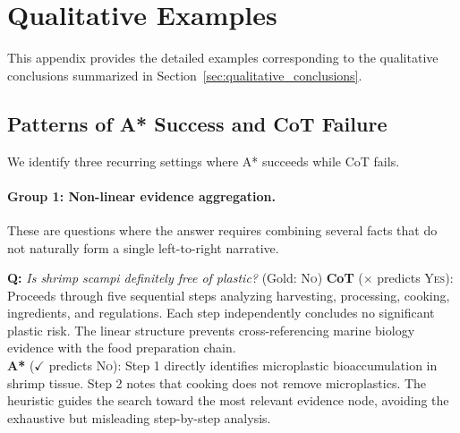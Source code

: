 \documentclass[11pt]{article}
\begin{document}



\section{Qualitative Examples}
\label{app:qualitative_examples}

This appendix provides the detailed examples corresponding to the qualitative conclusions summarized in Section~\ref{sec:qualitative_conclusions}.

\subsection{Patterns of A* Success and CoT Failure}
\label{app:astar_success}

We identify three recurring settings where A* succeeds while CoT fails.

\paragraph{Group 1: Non-linear evidence aggregation.}
These are questions where the answer requires combining several facts that do not naturally form a single left-to-right narrative.

\begin{examplebox}[title=StrategyQA --- Non-linear Evidence Aggregation]
\textbf{Q:} \emph{Is shrimp scampi definitely free of plastic?} \quad (Gold: \textsc{No})
\tcblower
\textbf{CoT} ($\times$ predicts \textsc{Yes}): Proceeds through five sequential steps analyzing harvesting, processing, cooking, ingredients, and regulations. Each step independently concludes no significant plastic risk. The linear structure prevents cross-referencing marine biology evidence with the food preparation chain.\\[4pt]
\textbf{A*} ($\checkmark$ predicts \textsc{No}): Step 1 directly identifies microplastic bioaccumulation in shrimp tissue. Step 2 notes that cooking does not remove microplastics. The heuristic guides the search toward the most relevant evidence node, avoiding the exhaustive but misleading step-by-step analysis.
\end{examplebox}
\end{document}
